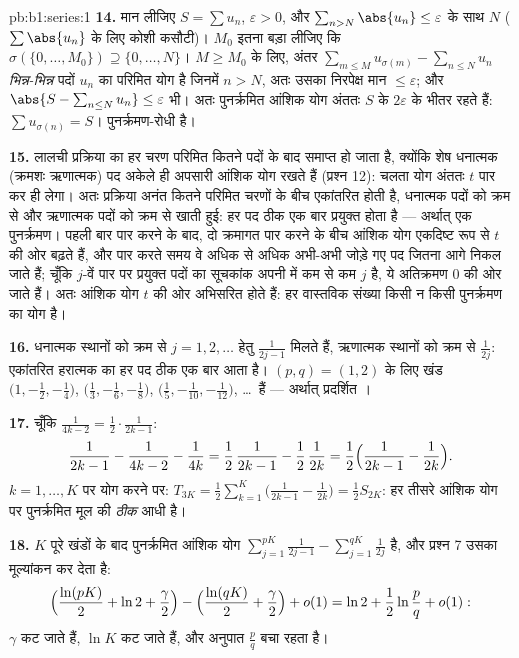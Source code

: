 \begin{solution}{pb:b1:series:1}
\textbf{14.} मान लीजिए $S = \sum u_n$, $\varepsilon > 0$, और $\sum_{n > N}
\abs{u_n} \leq \varepsilon$ के साथ $N$ ($\sum\abs{u_n}$ के लिए कोशी कसौटी)।
$M_0$ इतना बड़ा लीजिए कि $\sigma(\{0, \dots, M_0\}) \supseteq \{0, \dots,
N\}$। $M \geq M_0$ के लिए, अंतर $\sum_{m \leq M} u_{\sigma(m)} - \sum_{n
\leq N} u_n$ \emph{भिन्न-भिन्न} पदों $u_n$ का परिमित योग है जिनमें $n > N$,
अतः उसका निरपेक्ष मान $\leq \varepsilon$; और $\abs{S - \sum_{n\leq N} u_n}
\leq \varepsilon$ भी। अतः पुनर्क्रमित आंशिक योग अंततः $S$ के $2\varepsilon$
के भीतर रहते हैं: $\sum u_{\sigma(n)} = S$।  पुनर्क्रमण-रोधी
है।

\textbf{15.} लालची प्रक्रिया का हर चरण परिमित कितने पदों के बाद समाप्त हो
जाता है, क्योंकि शेष धनात्मक (क्रमशः ऋणात्मक) पद अकेले ही अपसारी आंशिक योग
रखते हैं (प्रश्न 12): चलता योग अंततः $t$ पार कर ही लेगा। अतः प्रक्रिया अनंत
कितने परिमित चरणों के बीच एकांतरित होती है, धनात्मक पदों को क्रम से और
ऋणात्मक पदों को क्रम से खाती हुई: हर पद ठीक एक बार प्रयुक्त होता है ---
अर्थात् एक पुनर्क्रमण। पहली बार पार करने के बाद, दो क्रमागत पार करने के बीच
आंशिक योग एकदिष्ट रूप से $t$ की ओर बढ़ते हैं, और पार करते समय वे अधिक से
अधिक अभी-अभी जोड़े गए पद जितना आगे निकल जाते हैं; चूँकि $j$-वें पार पर
प्रयुक्त पदों का सूचकांक अपनी  में कम से कम $j$ है, ये अतिक्रमण $0$ की
ओर जाते हैं। अतः आंशिक योग $t$ की ओर अभिसरित होते हैं: हर वास्तविक संख्या
किसी न किसी पुनर्क्रमण का योग है।

\textbf{16.} धनात्मक स्थानों को क्रम से $j = 1, 2, \dots$ हेतु
$\frac{1}{2j-1}$ मिलते हैं, ऋणात्मक स्थानों को क्रम से $\frac{1}{2j}$:
एकांतरित हरात्मक  का हर पद ठीक एक बार आता है। $(p, q) = (1, 2)$ के लिए
खंड $\bigl(1, -\frac12, -\frac14\bigr)$, $\bigl(\frac13, -\frac16,
-\frac18\bigr)$, $\bigl(\frac15, -\frac1{10}, -\frac1{12}\bigr)$, \dots\ हैं
--- अर्थात् प्रदर्शित ।

\textbf{17.} चूँकि $\frac{1}{4k-2} = \frac12\cdot\frac{1}{2k-1}$:
\[
\frac{1}{2k-1} - \frac{1}{4k-2} - \frac{1}{4k}
= \frac12\,\frac{1}{2k-1} - \frac12\,\frac{1}{2k}
= \frac12\Bigl(\frac{1}{2k-1} - \frac{1}{2k}\Bigr).
\]
$k = 1, \dots, K$ पर योग करने पर: $T_{3K} = \frac12
\sum_{k=1}^{K}\bigl(\frac{1}{2k-1} - \frac{1}{2k}\bigr) = \frac12 S_{2K}$:
हर तीसरे आंशिक योग पर पुनर्क्रमित  मूल  की \emph{ठीक} आधी है।

\textbf{18.} $K$ पूरे खंडों के बाद पुनर्क्रमित आंशिक योग
$\sum_{j=1}^{pK}\frac{1}{2j-1} - \sum_{j=1}^{qK}\frac{1}{2j}$ है, और प्रश्न
7 उसका मूल्यांकन कर देता है:
\[
\Bigl(\frac{\ln(pK)}{2} + \ln 2 + \frac\gamma2\Bigr)
- \Bigl(\frac{\ln(qK)}{2} + \frac\gamma2\Bigr) + o(1)
= \ln 2 + \frac12\ln\frac pq + o(1) :
\]
$\gamma$ कट जाते हैं, $\ln K$ कट जाते हैं, और अनुपात $\frac pq$ बचा रहता है।


\end{solution}
